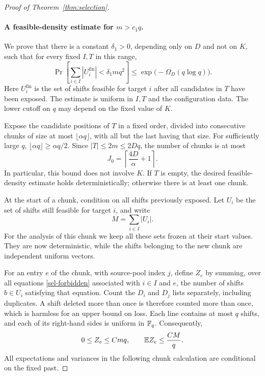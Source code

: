 \begin{proof}[Proof of Theorem~\ref{thm:selection}]
\paragraph{A feasible-density estimate for $m>c_1q$.}
We prove that there is a constant $\delta_1>0$, depending only on $D$
and not on $K$, such that for every fixed $I,T$ in this range,
\begin{equation}\label{sel-density-target}
 \Pr\!\left[
   \sum_{i\in I}|U_i^{\mathrm{fin}}|<\delta_1mq^2
 \right]
 \le \exp\bigl(-\Omega_D(q\log q)\bigr).
\end{equation}
Here $U_i^{\mathrm{fin}}$ is the set of shifts feasible for target $i$
after all candidates in $T$ have been exposed.  The estimate is uniform
in $I,T$ and the configuration data.  The lower cutoff on $q$ may
depend on the fixed value of $K$.

Expose the candidate positions of $T$ in a fixed order, divided into
consecutive chunks of size at most $\lfloor\alpha q\rfloor$, with all
but the last having that size.  For sufficiently large $q$,
$\lfloor\alpha q\rfloor\ge\alpha q/2$.  Since $|T|\le2m\le2Dq$,
the number of chunks is at most
\begin{equation}\label{sel-chunk-count}
 J_0=\left\lceil\frac{4D}{\alpha}+1\right\rceil.
\end{equation}
In particular, this bound does not involve $K$.  If $T$ is empty, the
desired feasible-density estimate holds deterministically; otherwise
there is at least one chunk.

At the start of a chunk, condition on all shifts previously exposed.
Let $U_i$ be the set of shifts still feasible for target $i$, and write
\[
 M=\sum_{i\in I}|U_i|.
\]
For the analysis of this chunk we keep all these sets frozen at their
start values.  They are now deterministic, while the shifts belonging
to the new chunk are independent uniform vectors.

For an entry $e$ of the chunk, with source-pool index $j$, define $Z_e$
by summing, over all equations \eqref{sel-forbidden} associated with
$i\in I$ and $e$, the number of shifts $b\in U_i$ satisfying that
equation.  Count the $D_i$ and $D_j$ lists separately, including
duplicates.  A shift deleted more than once is therefore counted more
than once, which is harmless for an upper bound on loss.  Each line
contains at most $q$ shifts, and each of its right-hand sides is uniform
in $\mathbb F_q$.  Consequently,
\begin{equation}\label{sel-Z-basic}
 0\le Z_e\le Cmq,
 \qquad \mathbb E Z_e\le \frac{CM}{q}.
\end{equation}
All expectations and variances in the following chunk calculation are
conditional on the fixed past.


\end{proof}
